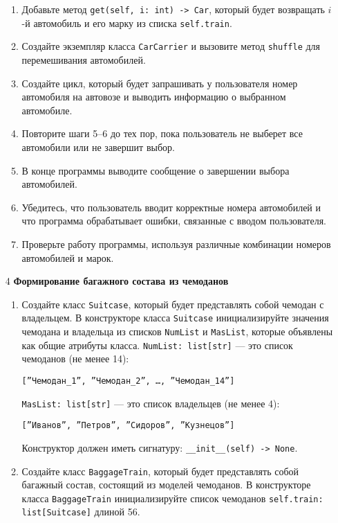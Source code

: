 \begin{enumerate}
\begin{enumerate}
    \item Добавьте метод \texttt{get(self, i: int) -> Car}, который будет возвращать $i$-й автомобиль и его марку из списка \texttt{self.train}.

    \item Создайте экземпляр класса \texttt{CarCarrier} и вызовите метод \texttt{shuffle} для перемешивания автомобилей.

    \item Создайте цикл, который будет запрашивать у пользователя номер автомобиля на автовозе и выводить информацию о выбранном автомобиле.

    \item Повторите шаги 5–6 до тех пор, пока пользователь не выберет все автомобили или не завершит выбор.

    \item В конце программы выводите сообщение о завершении выбора автомобилей.

    \item Убедитесь, что пользователь вводит корректные номера автомобилей и что программа обрабатывает ошибки, связанные с вводом пользователя.

    \item Проверьте работу программы, используя различные комбинации номеров автомобилей и марок.
\end{enumerate}

\item[4] \textbf{Формирование багажного состава из чемоданов}
\begin{enumerate}
    \item Создайте класс \texttt{Suitcase}, который будет представлять собой чемодан с владельцем. В конструкторе класса \texttt{Suitcase} инициализируйте значения чемодана и владельца из списков \texttt{NumList} и \texttt{MasList}, которые объявлены как общие атрибуты класса. \texttt{NumList: list[str]} — это список чемоданов (не менее 14): 
    \begin{center}
        \texttt{[''Чемодан\_1'', ''Чемодан\_2'', \dots, ''Чемодан\_14'']}
    \end{center}
    \texttt{MasList: list[str]} — это список владельцев (не менее 4):
    \begin{center}
        \texttt{[''Иванов'', ''Петров'', ''Сидоров'', ''Кузнецов'']}
    \end{center}
    Конструктор должен иметь сигнатуру: \texttt{\_\_init\_\_(self) -> None}.

    \item Создайте класс \texttt{BaggageTrain}, который будет представлять собой багажный состав, состоящий из моделей чемоданов. В конструкторе класса \texttt{BaggageTrain} инициализируйте список чемоданов \texttt{self.train: list[Suitcase]} длиной 56.


\end{enumerate}
\end{enumerate}
